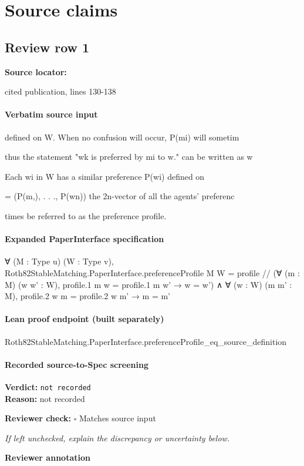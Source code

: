 \documentclass[10pt]{article}
\newcommand{\reviewerbox}{%
  \par\noindent\fbox{\parbox{0.96\linewidth}{\rule{0pt}{0.38in}}}\par
}
\newcommand{\reviewmatch}[1]{%
  \par\noindent\textbf{Reviewer check:} $\square$\; #1\par
  \noindent\emph{If left unchecked, explain the discrepancy or uncertainty below.}\par
}
\begin{document}
\clearpage
\hypertarget{source-claim-660a339fbfd3318f}{}
\hypertarget{source-section-f10b5f68e4acf3dc}{}
\section*{Source claims}
\subsection*{Review row 1}
\textbf{Source locator:} {\footnotesize\raggedright cited publication, lines 130-\allowbreak{}138\par}
\paragraph{Verbatim source input}
\begin{ReviewVerbatim}
defined on W. When no confusion will occur, P(mi) will sometim

thus the statement "wk is preferred by mi to w." can be written as w

Each wi in W has a similar preference P(wi) defined on

= (P(m,), . . ., P(wn)) the 2n-vector of all the agents' preferenc

times be referred to as the preference profile.
\end{ReviewVerbatim}


\paragraph{Expanded PaperInterface specification}
\begin{ReviewVerbatim}
∀ (M : Type u) (W : Type v),
  Roth82StableMatching.PaperInterface.preferenceProfile M W =
    { profile //
      (∀ (m : M) (w w' : W), profile.1 m w = profile.1 m w' → w = w') ∧
        ∀ (w : W) (m m' : M), profile.2 w m = profile.2 w m' → m = m' }
\end{ReviewVerbatim}

\paragraph{Lean proof endpoint (built separately)}\begin{ReviewVerbatim}
Roth82StableMatching.PaperInterface.preferenceProfile_eq_source_definition
\end{ReviewVerbatim}

\paragraph{Recorded source-to-Spec screening}
\textbf{Verdict:} \texttt{not recorded}
\\
\textbf{Reason:} not recorded
\reviewmatch{Matches source input}
\noindent\textbf{Reviewer annotation}\par
\reviewerbox
\clearpage
\hypertarget{source-claim-fd14fbb9277413b7}{}
\end{document}
